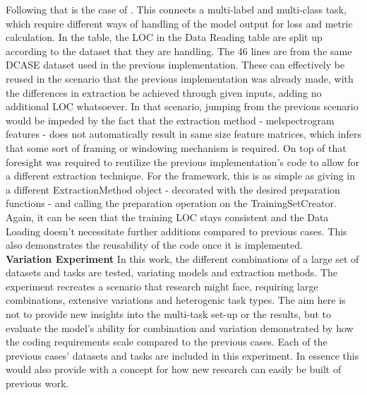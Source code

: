 \textbf{\cite{xu2019multi}} Following that is the case of \citep{xu2019multi}. This connects a multi-label and multi-class task, which require different ways of handling of the model output for loss and metric calculation. In the table, the LOC in the Data Reading table are split up according to the dataset that they are handling. The 46 lines are from the same DCASE dataset used in the previous implementation. These can effectively be reused in the scenario that the previous implementation was already made, with the differences in extraction be achieved through given inputs, adding no additional LOC whatsoever. In that scenario, jumping from the previous scenario would be impeded by the fact that the extraction method - melspectrogram features - does not automatically result in same size feature matrices, which infers that some sort of framing or windowing mechanism is required. On top of that foresight was required to reutilize the previous implementation's code to allow for a different extraction technique. For the framework, this is as simple as giving in a different ExtractionMethod object - decorated with the desired preparation functions - and calling the preparation operation on the TrainingSetCreator. Again, it can be seen that the training LOC stays consistent and the Data Loading doesn't necessitate further additions compared to previous cases. This also demonstrates the reusability of the code once it is implemented.\\

\textbf{Variation Experiment} In this work, the different combinations of a large set of datasets and tasks are tested, variating models and extraction methods. The experiment recreates a scenario that research might face, requiring large combinations, extensive variations and heterogenic task types. The aim here is not to provide new insights into the multi-task set-up or the results, but to evaluate the model's ability for combination and variation demonstrated by how the coding requirements scale compared to the previous cases. Each of the previous cases' datasets and tasks are included in this experiment. In essence this would also provide with a concept for how new research can easily be built of previous work.\\


